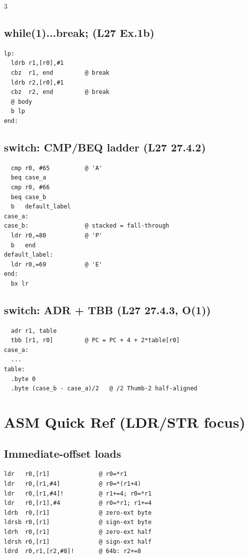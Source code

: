 \documentclass[8pt,landscape]{extarticle}
\begin{document}
\begin{multicols*}{3}
\subsection{while(1){...break;} (L27 Ex.1b)}
\begin{lstlisting}
lp:
  ldrb r1,[r0],#1
  cbz  r1, end         @ break
  ldrb r2,[r0],#1
  cbz  r2, end         @ break
  @ body
  b lp
end:
\end{lstlisting}

\subsection{switch: CMP/BEQ ladder (L27 27.4.2)}
\begin{lstlisting}
  cmp r0, #65          @ 'A'
  beq case_a
  cmp r0, #66
  beq case_b
  b   default_label
case_a:
case_b:                @ stacked = fall-through
  ldr r0,=80           @ 'P'
  b   end
default_label:
  ldr r0,=69           @ 'E'
end:
  bx lr
\end{lstlisting}

\subsection{switch: ADR + TBB (L27 27.4.3, O(1))}
\begin{lstlisting}
  adr r1, table
  tbb [r1, r0]         @ PC = PC + 4 + 2*table[r0]
case_a:
  ...
table:
  .byte 0
  .byte (case_b - case_a)/2   @ /2 Thumb-2 half-aligned
\end{lstlisting}

\section{ASM Quick Ref (LDR/STR focus)}

\subsection{Immediate-offset loads}
\begin{lstlisting}
ldr   r0,[r1]              @ r0=*r1
ldr   r0,[r1,#4]           @ r0=*(r1+4)
ldr   r0,[r1,#4]!          @ r1+=4; r0=*r1
ldr   r0,[r1],#4           @ r0=*r1; r1+=4
ldrb  r0,[r1]              @ zero-ext byte
ldrsb r0,[r1]              @ sign-ext byte
ldrh  r0,[r1]              @ zero-ext half
ldrsh r0,[r1]              @ sign-ext half
ldrd  r0,r1,[r2,#8]!       @ 64b: r2+=8
\end{lstlisting}


\end{multicols*}
\end{document}
